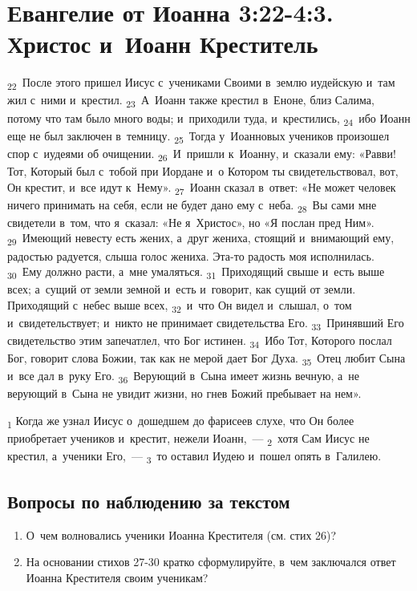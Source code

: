 \documentclass[a4paper,12pt]{article}
\begin{document}

\section{Евангелие от Иоанна 3:22-4:3. Христос и~Иоанн Креститель}

\textsubscript{22}~После этого пришел Иисус с~учениками Своими в~землю иудейскую и~там жил с~ними и~крестил. \textsubscript{23}~А~Иоанн также крестил в~Еноне, близ Салима, потому что там было много воды; и~приходили туда, и~крестились, \textsubscript{24}~ибо Иоанн еще не был заключен в~темницу. \textsubscript{25}~Тогда у~Иоанновых учеников произошел спор с~иудеями об очищении. \textsubscript{26}~И~пришли к~Иоанну, и~сказали ему: «Равви! Тот, Который был с~тобой при Иордане и~о Котором ты свидетельствовал, вот, Он крестит, и~все идут к~Нему». \textsubscript{27}~Иоанн сказал в~ответ: «Не может человек ничего принимать на себя, если не будет дано ему с~неба. \textsubscript{28}~Вы сами мне свидетели в~том, что я~сказал: «Не я~Христос», но «Я послан пред Ним». \textsubscript{29}~Имеющий невесту есть жених, а~друг жениха, стоящий и~внимающий ему, радостью радуется, слыша голос жениха. Эта-то радость моя исполнилась. \textsubscript{30}~Ему должно расти, а~мне умаляться. \textsubscript{31}~Приходящий свыше и~есть выше всех; а~сущий от земли земной и~есть и~говорит, как сущий от земли. Приходящий с~небес выше всех, \textsubscript{32}~и~что Он видел и~слышал, о~том и~свидетельствует; и~никто не принимает свидетельства Его. \textsubscript{33}~Принявший Его свидетельство этим запечатлел, что Бог истинен. \textsubscript{34}~Ибо Тот, Которого послал Бог, говорит слова Божии, так как не мерой дает Бог Духа. \textsubscript{35}~Отец любит Сына и~все дал в~руку Его. \textsubscript{36}~Верующий в~Сына имеет жизнь вечную, а~не верующий в~Сына не увидит жизни, но гнев Божий пребывает на нем».

\textsubscript{1} Когда же узнал Иисус о~дошедшем до фарисеев слухе, что Он более приобретает учеников и~крестит, нежели Иоанн,~--- \textsubscript{2}~хотя Сам Иисус не крестил, а~ученики Его,~--- \textsubscript{3}~то оставил Иудею и~пошел опять в~Галилею. 

\subsection*{Вопросы по наблюдению за текстом}
\begin{enumerate}
    \item О~чем волновались ученики Иоанна Крестителя (см. стих 26)? 
    
    \myline
    
    \myline
    \item На основании стихов 27-30 кратко сформулируйте, в~чем заключался ответ Иоанна Крестителя своим ученикам?
    
    \myline
    
    \myline
\end{enumerate}
\end{document}
